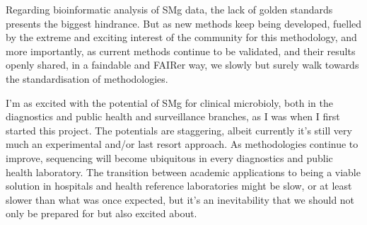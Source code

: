 Regarding bioinformatic analysis of \ac{SMg} data, the lack of golden standards presents the biggest hindrance. But as new methods keep being developed, fuelled by the extreme and exciting interest of the community for this methodology, and more importantly, as current methods continue to be validated, and their results openly shared, in a faindable and FAIRer way, we slowly but surely walk towards the standardisation of methodologies. 

I'm as excited with the potential of \ac{SMg} for clinical microbioly, both in the diagnostics and public health and surveillance branches, as I was when I first started this project. The potentials are staggering, albeit currently it's still very much an experimental and/or last resort approach. As methodologies continue to improve, sequencing will become ubiquitous in every diagnostics and public health laboratory. The transition between academic applications to being a viable solution in hospitals and health reference laboratories might be slow, or at least slower than what was once expected, but it's an inevitability that we should not only be prepared for but also excited about. 